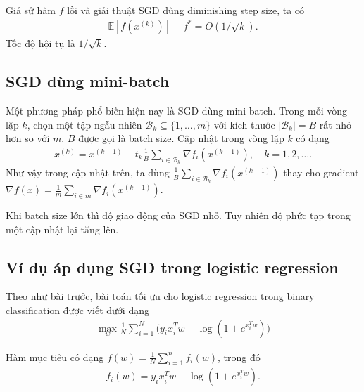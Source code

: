 \documentclass{book}
\begin{document}
Giả sử hàm $f$ lồi và giải thuật SGD dùng diminishing step size, ta có
\begin{align*}
\mathbb{E}[ f(x^{(k)})] - f^* = O(1 / \sqrt{k}).
\end{align*}
Tốc độ hội tụ là $1/\sqrt{k}$.


\subsection{SGD dùng mini-batch}
Một phương pháp phổ biến hiện nay là SGD dùng mini-batch.
Trong mỗi vòng lặp $k$, chọn một tập ngẫu nhiên  $\mathcal{B}_k \subseteq \{1, \ldots, m\}$ với kích thước $|\mathcal{B}_k| = B$ rất nhỏ hơn so với $m$. $B$ được gọi là batch size. Cập nhật trong vòng lặp $k$ có dạng
\begin{align*}
x^{(k)} = x^{(k-1)} - t_k \frac{1}{B} \sum_{i \in \mathcal{B}_k} \nabla f_{i} (x^{(k-1)}), \quad k=1,2,\ldots.
\end{align*}
Như vậy trong cập nhật trên, ta dùng $\frac{1}{B} \sum_{i \in \mathcal{B}_k} \nabla f_{i} (x^{(k-1)})$ thay cho gradient $\nabla f(x) = \frac{1}{m} \sum_{i \in m} \nabla f_{i} (x^{(k-1)})$.

Khi batch size lớn thì độ giao động của SGD nhỏ. Tuy nhiên độ phức tạp trong một cập nhật lại tăng lên. 




\subsection{Ví dụ áp dụng SGD trong logistic regression}
Theo như bài trước, bài toán tối ưu cho logistic regression trong binary classification được viết dưới dạng
\begin{align*}
\max_{w} \frac{1}{N} \sum_{i = 1}^N \Big( y_i x_i^T w - \log (1 + e^{x_i^T w}) \Big)
\end{align*}

Hàm mục tiêu có dạng $f(w) =  \frac{1}{N} \sum_{i = 1}^n f_i(w)$, trong đó
\begin{align*}
f_i(w) =  y_i x_i^T w - \log (1 + e^{x_i^T w}).
\end{align*}
\end{document}
